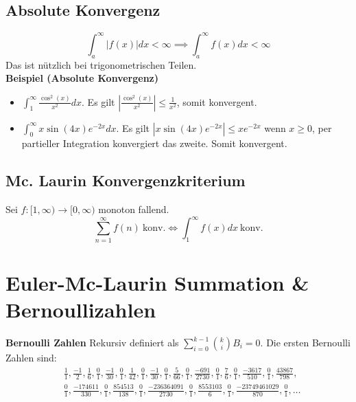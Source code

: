 \documentclass[25pt]{sciposter}
\begin{document}
\begin{multicols}{3}
\subsection*{Absolute Konvergenz}
$$ \int_{a}^{\infty} \left| f(x) \right| dx <\infty \implies \int_{a}^{\infty}f(x) dx < \infty $$
Das ist nützlich bei trigonometrischen Teilen.\\
\textbf{Beispiel (Absolute Konvergenz)} 
\begin{itemize}
	\item $\int_{1}^{\infty} \frac{\cos^2(x)}{x^2} dx$. Es gilt $\left| \frac{\cos^2(x)}{x^2}\right|\leq \frac{1}{x^2}$, somit konvergent.
	\item $\int_0 ^\infty x\sin(4x)e^{-2x} dx$. Es gilt $|x\sin(4x)e^{-2x}| \leq xe^{-2x}$ wenn $x\geq 0$, per partieller Integration konvergiert das zweite. Somit konvergent.
\end{itemize}

\subsection*{Mc. Laurin Konvergenzkriterium}
Sei $f:[1,\infty) \to [0,\infty)$ monoton fallend.
$$\sum_{n=1}^{\infty} f(n) \ \text{konv.}  \iff    \int_{1}^{\infty} f(x) dx \ \text{konv.}$$




\section*{Euler-Mc-Laurin Summation \& Bernoullizahlen}

\textbf{Bernoulli Zahlen} Rekursiv definiert als $\sum_{i=0}^{k-1} {k \choose i}  B_i = 0$. Die ersten Bernoulli Zahlen sind:
\begin{align*}
 &{\tfrac {1}{1}},{\tfrac {-1}{2}},{\tfrac {1}{6}},{\tfrac {0}{1}},{\tfrac {-1}{30}},{\tfrac {0}{1}},{\tfrac {1}{42}},{\tfrac {0}{1}},{\tfrac {-1}{30}},{\tfrac {0}{1}},{\tfrac {5}{66}},{\tfrac {0}{1}},{\tfrac {-691}{2730}},{\tfrac {0}{1}},{\tfrac {7}{6}},{\tfrac {0}{1}},{\tfrac {-3617}{510}},{\tfrac {0}{1}},{\tfrac {43867}{798}},\\ 
 &{\tfrac {0}{1}},{\tfrac {-174611}{330}},{\tfrac {0}{1}},{\tfrac {854513}{138}},{\tfrac {0}{1}},{\tfrac {-236364091}{2730}},{\tfrac {0}{1}},{\tfrac {8553103}{6}},{\tfrac {0}{1}},{\tfrac {-23749461029}{870}},{\tfrac {0}{1}},\ldots
\end{align*}


\end{multicols}
\end{document}
